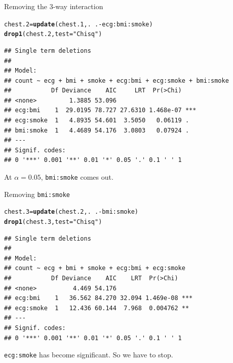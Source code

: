 \documentclass[unknownkeysallowed]{beamer}\usepackage[]{graphicx}\usepackage[]{color}
\makeatletter
\newcommand{\hlstr}[1]{\textcolor[rgb]{0.192,0.494,0.8}{#1}}%
\newcommand{\hlopt}[1]{\textcolor[rgb]{0,0,0}{#1}}%
\newcommand{\hlstd}[1]{\textcolor[rgb]{0.345,0.345,0.345}{#1}}%
\newcommand{\hlkwb}[1]{\textcolor[rgb]{0.69,0.353,0.396}{#1}}%
\newcommand{\hlkwc}[1]{\textcolor[rgb]{0.333,0.667,0.333}{#1}}%
\newcommand{\hlkwd}[1]{\textcolor[rgb]{0.737,0.353,0.396}{\textbf{#1}}}%
\newenvironment{kframe}{%
 \def\at@end@of@kframe{}%
 \ifinner\ifhmode%
  \def\at@end@of@kframe{\end{minipage}}%
  \begin{minipage}{\columnwidth}%
 \fi\fi%
 \def\FrameCommand##1{\hskip\@totalleftmargin \hskip-\fboxsep
 \colorbox{shadecolor}{##1}\hskip-\fboxsep
     \hskip-\linewidth \hskip-\@totalleftmargin \hskip\columnwidth}%
 \MakeFramed {\advance\hsize-\width
   \@totalleftmargin\z@ \linewidth\hsize
   \@setminipage}}%
 {\par\unskip\endMakeFramed%
 \at@end@of@kframe}
\newenvironment{knitrout}{}{} %
\makeatother
\begin{document}
\begin{frame}[fragile]{Removing the 3-way interaction}
  
\begin{knitrout}\small
{}\color{fgcolor}\begin{kframe}
\begin{alltt}
\hlstd{chest.2}\hlkwb{=}\hlkwd{update}\hlstd{(chest.1,.}\hlopt{~}\hlstd{.}\hlopt{-}\hlstd{ecg}\hlopt{:}\hlstd{bmi}\hlopt{:}\hlstd{smoke)}
\hlkwd{drop1}\hlstd{(chest.2,}\hlkwc{test}\hlstd{=}\hlstr{"Chisq"}\hlstd{)}
\end{alltt}
\begin{verbatim}
## Single term deletions
## 
## Model:
## count ~ ecg + bmi + smoke + ecg:bmi + ecg:smoke + bmi:smoke
##           Df Deviance    AIC     LRT  Pr(>Chi)    
## <none>         1.3885 53.096                      
## ecg:bmi    1  29.0195 78.727 27.6310 1.468e-07 ***
## ecg:smoke  1   4.8935 54.601  3.5050   0.06119 .  
## bmi:smoke  1   4.4689 54.176  3.0803   0.07924 .  
## ---
## Signif. codes:  
## 0 '***' 0.001 '**' 0.01 '*' 0.05 '.' 0.1 ' ' 1
\end{verbatim}
\end{kframe}
\end{knitrout}

At $\alpha=0.05$, \texttt{bmi:smoke} comes out.
  
\end{frame}

\begin{frame}[fragile]{Removing \texttt{bmi:smoke}}
  
\begin{knitrout}\small
{}\color{fgcolor}\begin{kframe}
\begin{alltt}
\hlstd{chest.3}\hlkwb{=}\hlkwd{update}\hlstd{(chest.2,.}\hlopt{~}\hlstd{.}\hlopt{-}\hlstd{bmi}\hlopt{:}\hlstd{smoke)}
\hlkwd{drop1}\hlstd{(chest.3,}\hlkwc{test}\hlstd{=}\hlstr{"Chisq"}\hlstd{)}
\end{alltt}
\begin{verbatim}
## Single term deletions
## 
## Model:
## count ~ ecg + bmi + smoke + ecg:bmi + ecg:smoke
##           Df Deviance    AIC    LRT  Pr(>Chi)    
## <none>          4.469 54.176                     
## ecg:bmi    1   36.562 84.270 32.094 1.469e-08 ***
## ecg:smoke  1   12.436 60.144  7.968  0.004762 ** 
## ---
## Signif. codes:  
## 0 '***' 0.001 '**' 0.01 '*' 0.05 '.' 0.1 ' ' 1
\end{verbatim}
\end{kframe}
\end{knitrout}

\texttt{ecg:smoke} has become significant. So we have to stop.
  
\end{frame}
\end{document}
